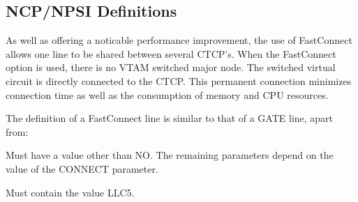 \documentclass[letterpaper,10pt,english]{sphinxmanual}
\begin{document}
\ignorespaces 

\subsection{NCP/NPSI Definitions}
\label{\detokenize{connectivity_guide:ncp-npsi-definitions}}\label{\detokenize{connectivity_guide:index-72}}
\sphinxAtStartPar
As well as offering a noticable performance improvement, the use of Fast\sphinxhyphen{}Connect allows one line to be shared between several CTCP’s. When the Fast\sphinxhyphen{}Connect option is used, there is no VTAM switched major node. The switched virtual circuit is directly connected to the CTCP. This permanent connection minimizes connection time as well as the consumption of memory and CPU resources.

\sphinxAtStartPar
The definition of a Fast\sphinxhyphen{}Connect line is similar to that of a GATE line, apart from:

\sphinxAtStartPar
{}
\begin{description}
\sphinxAtStartPar
Must have a value other than NO. The remaining parameters depend on
the value of the CONNECT parameter.

\sphinxAtStartPar
Must contain the value LLC5.

\end{description}

\ignorespaces 
\end{document}
